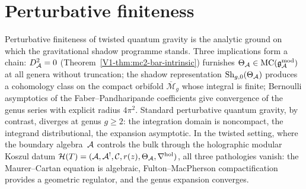 %

\section{Perturbative finiteness}
\label{sec:thqg-perturbative-finiteness}
\label{ch:thqg-perturbative-finiteness}%

\providecommand{\HS}{\operatorname{HS}}
\providecommand{\Tr}{\operatorname{Tr}}
\providecommand{\Det}{\operatorname{Det}}
\providecommand{\Fred}{\operatorname{Fred}}
\providecommand{\rank}{\operatorname{rank}}
\providecommand{\Sym}{\operatorname{Sym}}
\providecommand{\id}{\mathrm{id}}
\providecommand{\ad}{\operatorname{ad}}
\providecommand{\wt}{\operatorname{wt}}
\providecommand{\Aut}{\operatorname{Aut}}
\providecommand{\Res}{\operatorname{Res}}
\providecommand{\Defcyc}{\operatorname{Def}_{\mathrm{cyc}}}
\providecommand{\gAmod}{\mathfrak{g}_{\cA}^{\mathrm{mod}}}
\providecommand{\Gmod}{\mathcal{G}^{\mathrm{mod}}}

Perturbative finiteness of twisted quantum gravity is the analytic ground on which the gravitational shadow programme stands. Three implications form a chain: $D_{\mathcal{A}}^2 = 0$ (Theorem~\ref*{V1-thm:mc2-bar-intrinsic}) furnishes $\Theta_\cA \in \mathrm{MC}(\gAmod)$ at all genera without truncation; the shadow representation $\operatorname{Sh}_{g,0}(\Theta_{\mathcal{A}})$ produces a cohomology class on the compact orbifold $\overline{\mathcal{M}}_g$ whose integral is finite; Bernoulli asymptotics of the Faber--Pandharipande coefficients give convergence of the genus series with explicit radius $4\pi^2$. Standard perturbative quantum gravity, by contrast, diverges at genus $g \geq 2$: the integration domain is noncompact, the integrand distributional, the expansion asymptotic. In the twisted setting, where the boundary algebra~$\mathcal{A}$ controls the bulk through the holographic modular Koszul datum $\mathcal{H}(T) = (\mathcal{A}, \mathcal{A}^!, \mathcal{C}, r(z), \Theta_{\mathcal{A}}, \nabla^{\mathrm{hol}})$, all three pathologies vanish: the Maurer--Cartan equation is algebraic, Fulton--MacPherson compactification provides a geometric regulator, and the genus expansion converges.

